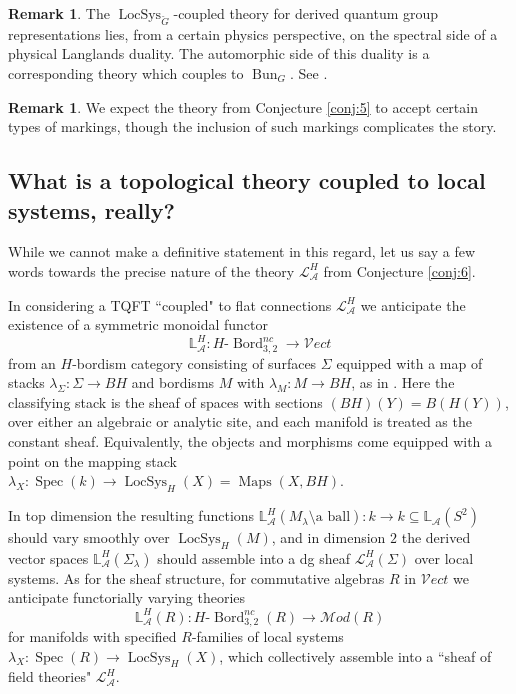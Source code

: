 \documentclass[reqno]{amsart}
\theoremstyle{definition}
\newtheorem{remark}[lemma]{Remark}
\newcommand{\mbb}[1]{\mathbb{#1}}
\newcommand{\mcl}[1]{\mathcal{#1}}
\newcommand{\msc}[1]{\mathscr{#1}}
\newcommand{\opn}[1]{\operatorname{#1}}
\newcommand{\Vect}{\msc{V}\!ect}
\DeclareMathOperator{\Maps}{Maps}
\DeclareMathOperator{\Bord}{Bord}
\renewcommand{\1}{\mathbf{1}}
\begin{document}
\begin{remark}
The $\opn{LocSys}_{\check{G}}$-coupled theory for derived quantum group representations lies, from a certain physics perspective, on the spectral side of a physical Langlands duality. The automorphic side of this duality is a corresponding theory which couples to $\opn{Bun}_{G}$. See \cite{kapustinwitten06,gaiotto18,gaiotto19}.
\end{remark}

\begin{remark}
We expect the theory from Conjecture \ref{conj:5} to accept certain types of markings, though the inclusion of such markings complicates the story.
\end{remark}

\subsection{What is a topological theory coupled to local systems, really?}
\label{sect:locsys_formal}

While we cannot make a definitive statement in this regard, let us say a few words towards the precise nature of the theory $\mcl{L}_{\msc{A}}^H$ from Conjecture \ref{conj:6}.
\par

In considering a TQFT ``coupled" to flat connections $\mcl{L}_\msc{A}^H$ we anticipate the existence of a symmetric monoidal functor
\[
\mbb{L}^H_{\msc{A}}:H\text{-}\Bord_{3,2}^{nc}\to \Vect
\]
from an $H$-bordism category consisting of surfaces $\Sigma$ equipped with a map of stacks $\lambda_{\Sigma}:\Sigma\to BH$ and bordisms $M$ with $\lambda_M:M\to BH$, as in \cite{turaev00}. Here the classifying stack is the sheaf of spaces with sections $(BH)(Y)=B(H(Y))$, over either an algebraic or analytic site, and each manifold is treated as the constant sheaf.  Equivalently, the objects and morphisms come equipped with a point on the mapping stack $\lambda_X:\opn{Spec}(k)\to \opn{LocSys}_H(X)=\Maps(X,BH)$.
\par

In top dimension the resulting functions $\mbb{L}_{\msc{A}}^H(M_{\lambda}\setminus\text{a ball}):k\to k\subseteq \mbb{L}_{\msc{A}}(S^2)$ should vary smoothly over $\opn{LocSys}_H(M)$, and in dimension $2$ the derived vector spaces $\mbb{L}^H_{\msc{A}}(\Sigma_{\lambda})$ should assemble into a dg sheaf $\mcl{L}^H_{\msc{A}}(\Sigma)$ over local systems.  As for the sheaf structure, for commutative algebras $R$ in $\Vect$ we anticipate functorially varying theories
\[
\mbb{L}^H_{\msc{A}}(R):H\text{-}\Bord_{3,2}^{nc}(R)\to \msc{M}\!od(R)
\]
for manifolds with specified $R$-families of local systems $\lambda_X:\opn{Spec}(R)\to \opn{LocSys}_H(X)$, which collectively assemble into a ``sheaf of field theories" $\mcl{L}_{\msc{A}}^H$.
\end{document}
